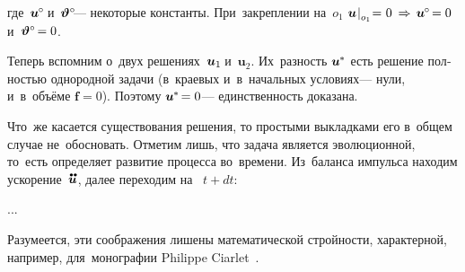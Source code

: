 \begin{otherlanguage}{russian}
\vspace{-0.25em} \noindent где~${\bm{u}^{\hspace{-0.1ex}\circ} \hspace{-0.32ex}}$ и~${\bm{\vartheta}^{\circ} \hspace{-0.5ex}}$\:--- некоторые константы.
При~закреплении на~${o_1}$ ${\bm{u} \hspace{.16ex} \rvert_{\raisemath{-0.1em}{o_1}} \hspace{-0.5ex} = \hspace{.1ex} 0 \hspace{.1ex} \,\Rightarrow\, \bm{u}^{\hspace{-0.1ex}\circ} \hspace{-0.3ex} = 0}$ и~${\bm{\vartheta}^{\circ} \hspace{-0.3ex} = 0}$.

Теперь вспомним о~двух решениях~${\bm{u}_1\hspace{-0.25ex}}$ и~${\bm{u}_2}$. Их~разность ${\bm{u}^{\hspace{-0.1ex}*}}$ есть решение полностью однородной задачи (в~краевых и~в~начальных условиях\:--- нули, и~в~объёме ${\bm{f} = 0}$). Поэтому ${\bm{u}^{\hspace{-0.1ex}*} \hspace{-0.32ex} = 0}$\:--- единственность доказана.

Что~же касается существования решения, то простыми выкладками его в~общем случае не~обосновать. Отметим лишь, что задача является эволюционной, то~есть определяет развитие процесса во~времени. Из~баланса импульса находим ускорение~$\mathdotdotabove{\bm{u}}$, далее переходим на~ ${t + dt}$:

...


Разумеется, эти соображения лишены математической стройности, характерной, например, для~монографии Philippe Ciarlet~\cite{ciarlet-mathematicalelasticity}.

\end{otherlanguage}



